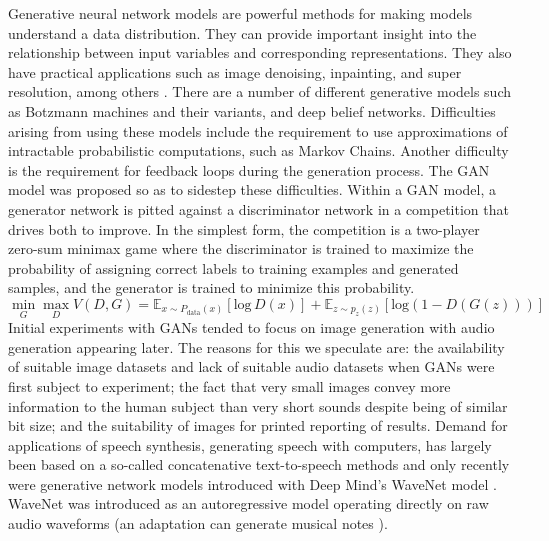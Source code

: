 \documentclass[a4paper, dvipsnames, titlepage]{article}
\begin{document}
Generative neural network models are powerful methods for making models understand a data distribution.
They can provide important insight into the relationship between input variables and corresponding representations.
They also have practical applications such as image denoising, inpainting, and super resolution, among others \citep{openai_blog_2017}.
\newline
\newline
There are a number of different generative models such as Botzmann machines and their variants, and deep belief networks.
Difficulties arising from using these models include the requirement to use approximations of intractable probabilistic computations, such as Markov Chains.
Another difficulty is the requirement for feedback loops during the generation process.
The GAN model was proposed so as to sidestep these difficulties.
\newline
\newline
Within a GAN model, a generator network is pitted against a discriminator network in a competition that drives both to improve.
In the simplest form, the competition is a two-player zero-sum minimax game where the discriminator is trained to maximize the probability of assigning correct labels to training examples and generated samples, and the generator is trained to minimize this probability.
\begin{equation}
  \min_{G} \max_{D} V(D,G) = \mathbb{E}_{x \sim P_\mathrm{data}(x)}[\mathrm{log}\,D(x)] + \mathbb{E}_{z \sim p_z(z)}[\mathrm{log} (1 - D(G(z)))]
\end{equation}
\newline
\newline
Initial experiments with GANs tended to focus on image generation with audio generation appearing later.
The reasons for this we speculate are: the availability of suitable image datasets and lack of suitable audio datasets when GANs were first subject to experiment; the fact that very small images convey more information to the human subject than very short sounds despite being of similar bit size; and the suitability of images for printed reporting of results.
\newline
\newline
Demand for applications of speech synthesis, generating speech with computers, has largely been based on a so-called concatenative text-to-speech methods and only recently were generative network models introduced with Deep Mind's WaveNet model \citep{waveNetUrl}.
WaveNet was introduced as an autoregressive model operating directly on raw audio waveforms \citep{DBLP:journals/corr/OordDZSVGKSK16} (an adaptation can generate musical notes \citep{2017arXiv170401279E}).
\end{document}
